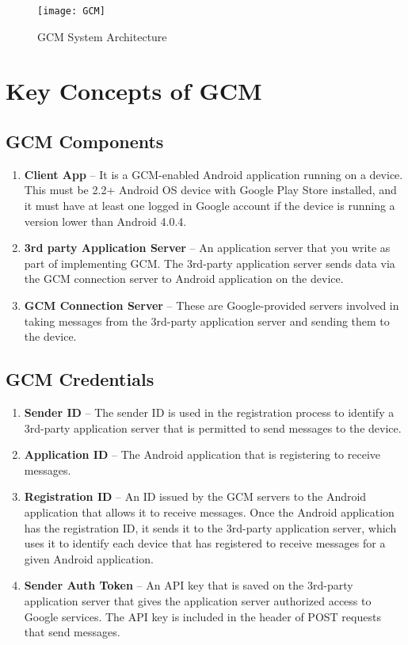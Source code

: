 \begin{figure}[H]
\begin{center}   
\texttt{[image: GCM]}
\caption{GCM System Architecture}
\label{fig:GCM}
\end{center}
\end{figure}

\section {Key Concepts of GCM}

\subsection {GCM Components}
\begin {enumerate}
  \item\textbf { Client App} – It is a GCM-enabled Android application running on a device. This must be 2.2+ Android OS device with Google Play Store installed, and it must have at least one logged in Google account if the device is running a version lower than Android 4.0.4.

   \item\textbf { 3rd party Application Server }– An application server that you write as part of implementing GCM. The 3rd-party application server sends data via the GCM connection server to Android application on the device.

    \item\textbf {GCM Connection Server} – These are Google-provided servers involved in taking messages from the 3rd-party application server and sending them to the device.

\end {enumerate}

\subsection {GCM Credentials}
\begin {enumerate}
  \item\textbf {Sender ID} – The sender ID is used in the registration process to identify a 3rd-party application server that is permitted to send messages to the device.

    \item\textbf{Application ID} – The Android application that is registering to receive messages.

    \item\textbf {Registration ID } – An ID issued by the GCM servers to the Android application that allows it to receive messages. Once the Android application has the registration ID, it sends it to the 3rd-party application server, which uses it to identify each device that has registered to receive messages for a given Android application.
    
 \item\textbf {    Sender Auth Token} – An API key that is saved on the 3rd-party application server that gives the application server authorized access to Google services. The API key is included in the header of POST requests that send messages.
\end {enumerate}

